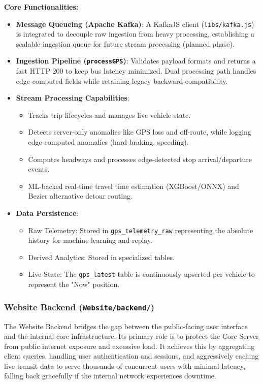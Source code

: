 \documentclass[a4paper]{article}
\begin{document}
\textbf{Core Functionalities:}
\begin{itemize}
    \item \textbf{Message Queueing (Apache Kafka)}: A KafkaJS client (\texttt{libs/kafka.js}) is integrated to decouple raw ingestion from heavy processing, establishing a scalable ingestion queue for future stream processing (planned phase).
    \item \textbf{Ingestion Pipeline (\texttt{processGPS})}: Validates payload formats and returns a fast HTTP 200 to keep bus latency minimized. Dual processing path handles edge-computed fields while retaining legacy backward-compatibility.
    \item \textbf{Stream Processing Capabilities}:
    \begin{itemize}
        \item Tracks trip lifecycles and manages live vehicle state.
        \item Detects server-only anomalies like GPS loss and off-route, while logging edge-computed anomalies (hard-braking, speeding).
        \item Computes headways and processes edge-detected stop arrival/departure events.
        \item ML-backed real-time travel time estimation (XGBoost/ONNX) and Bezier alternative detour routing.
    \end{itemize}
    \item \textbf{Data Persistence}:
    \begin{itemize}
        \item Raw Telemetry: Stored in \texttt{gps\_telemetry\_raw} representing the absolute history for machine learning and replay.
        \item Derived Analytics: Stored in specialized tables.
        \item Live State: The \texttt{gps\_latest} table is continuously upserted per vehicle to represent the "Now" position.
    \end{itemize}
\end{itemize}

\subsubsection{Website Backend (\texttt{Website/backend/})}
The Website Backend bridges the gap between the public-facing user interface and the internal core infrastructure. Its primary role is to protect the Core Server from public internet exposure and excessive load. It achieves this by aggregating client queries, handling user authentication and sessions, and aggressively caching live transit data to serve thousands of concurrent users with minimal latency, falling back gracefully if the internal network experiences downtime.
\end{document}
